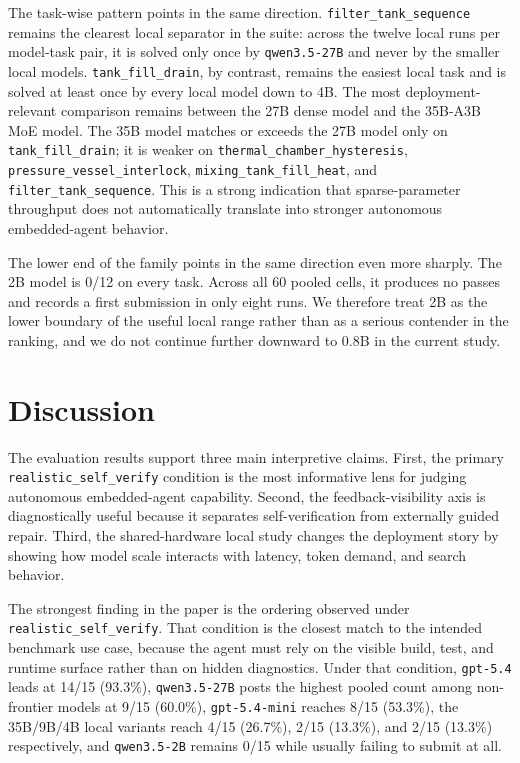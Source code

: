 \documentclass[a4paper,fleqn]{cas-dc}
\DeclareRobustCommand{\tool}[1]{\texttt{\nolinkurl{#1}}}
\begin{document}
The task-wise pattern points in the same direction. \tool{filter_tank_sequence} remains the clearest local separator in the suite: across the twelve local runs per model-task pair, it is solved only once by \tool{qwen3.5-27B} and never by the smaller local models. \tool{tank_fill_drain}, by contrast, remains the easiest local task and is solved at least once by every local model down to 4B. The most deployment-relevant comparison remains between the 27B dense model and the 35B-A3B MoE model. The 35B model matches or exceeds the 27B model only on \tool{tank_fill_drain}; it is weaker on \tool{thermal_chamber_hysteresis}, \tool{pressure_vessel_interlock}, \tool{mixing_tank_fill_heat}, and \tool{filter_tank_sequence}. This is a strong indication that sparse-parameter throughput does not automatically translate into stronger autonomous embedded-agent behavior.

The lower end of the family points in the same direction even more sharply. The 2B model is 0/12 on every task. Across all 60 pooled cells, it produces no passes and records a first submission in only eight runs. We therefore treat 2B as the lower boundary of the useful local range rather than as a serious contender in the ranking, and we do not continue further downward to 0.8B in the current study.

\section{Discussion}
\label{sec:discussion}

The evaluation results support three main interpretive claims. First, the primary \tool{realistic_self_verify} condition is the most informative lens for judging autonomous embedded-agent capability. Second, the feedback-visibility axis is diagnostically useful because it separates self-verification from externally guided repair. Third, the shared-hardware local study changes the deployment story by showing how model scale interacts with latency, token demand, and search behavior.

The strongest finding in the paper is the ordering observed under \tool{realistic_self_verify}. That condition is the closest match to the intended benchmark use case, because the agent must rely on the visible build, test, and runtime surface rather than on hidden diagnostics. Under that condition, \tool{gpt-5.4} leads at 14/15 (93.3\%), \tool{qwen3.5-27B} posts the highest pooled count among non-frontier models at 9/15 (60.0\%), \tool{gpt-5.4-mini} reaches 8/15 (53.3\%), the 35B/9B/4B local variants reach 4/15 (26.7\%), 2/15 (13.3\%), and 2/15 (13.3\%) respectively, and \tool{qwen3.5-2B} remains 0/15 while usually failing to submit at all.
\end{document}
